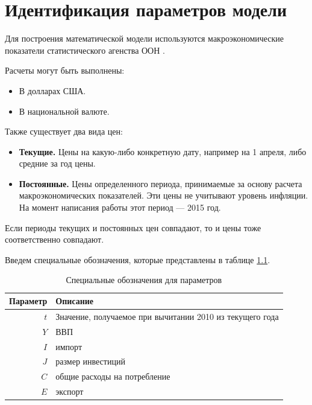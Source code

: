 \chapter{Идентификация параметров модели}
\label{cha:ident_params}

Для построения математической модели используются макроэкономические показатели статистического агенства ООН \cite{unstat}.

Расчеты могут быть выполнены:
\begin{itemize}
	\item В долларах США.
	\item В национальной валюте.
\end{itemize}

Также существует два вида цен:
\begin{itemize}
	\item \textbf{Текущие.}
	Цены на какую-либо конкретную дату, например на 1 апреля, либо средние за год цены.
	\item \textbf{Постоянные.}
	Цены определенного периода, принимаемые за основу расчета макроэкономических показателей.
	Эти цены не учитывают уровень инфляции.
	На момент написания работы этот период --- 2015 год.
\end{itemize}
Если периоды текущих и постоянных цен совпадают, то и цены тоже соответственно совпадают.

Введем специальные обозначения, которые представлены в таблице \ref{tab:desig_of_params}.

\begin{table}[ht]
	\caption{Специальные обозначения для параметров}
	\begin{tabular}{|r|l|}
	\hline
	\multicolumn{1}{|r|}{Параметр} & \multicolumn{1}{l|}{Описание} \\ \hline
	$t$                          &Значение, получаемое при вычитании 2010 из текущего года\\
	$Y$                          & ВВП                                                   \\
	$I$                          & импорт                                                \\
	$J$                          & размер инвестиций                                     \\
	$C$                          & общие расходы на потребление                          \\
	$E$                          & экспорт                                               \\ \hline
	\end{tabular}
	\label{tab:desig_of_params}
\end{table}


